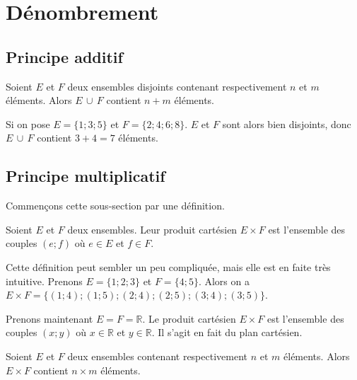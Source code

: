 	\section{Dénombrement}

	\subsection{Principe additif}

	\begin{formula}
		Soient $E$ et $F$ deux ensembles disjoints contenant respectivement $n$ et $m$ éléments. Alors $E \, \cup \, F$ contient $n + m$ éléments.
	\end{formula}

	\begin{tip}[Exemple]
		Si on pose $E = \{1; 3; 5\}$ et $F = \{2; 4; 6; 8\}$. $E$ et $F$ sont alors bien disjoints, donc $E \, \cup \, F$ contient $3 + 4 = 7$ éléments.
	\end{tip}

	\subsection{Principe multiplicatif}

	Commençons cette sous-section par une définition.

	\begin{formula}
		Soient $E$ et $F$ deux ensembles. Leur produit cartésien $E \times F$ est l'ensemble des couples $(e; f)$ où $e \in E$ et $f \in F$.
	\end{formula}

	\begin{tip}[Exemple]
		Cette définition peut sembler un peu compliquée, mais elle est en faite très intuitive. Prenons $E = \{1; 2; 3\}$ et $F = \{4; 5\}$.
		\newpar
		Alors on a $E \times F = \{(1; 4); (1; 5); (2; 4); (2; 5); (3; 4); (3; 5)\}$.
	\end{tip}

	\begin{tip}
		Prenons maintenant $E = F = \mathbb{R}$. Le produit cartésien $E \times F$ est l'ensemble des couples $(x; y)$ où $x \in \mathbb{R}$ et $y \in \mathbb{R}$.
		\newpar
		Il s'agit en fait du plan cartésien.
	\end{tip}

	\begin{formula}
		Soient $E$ et $F$ deux ensembles contenant respectivement $n$ et $m$ éléments. Alors $E \times F$ contient $n \times m$ éléments.
	\end{formula}

